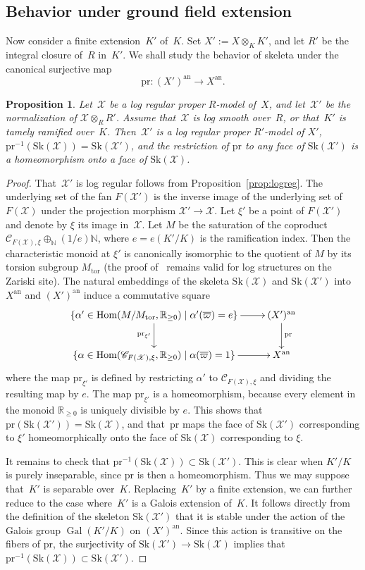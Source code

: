 \documentclass[11pt]{article}
\let\mathcal\mathscr
\newtheorem{prop}[equation]{Proposition}
\theoremstyle{definition}
\numberwithin{equation}{subsection}
\newcommand{\N}{\ensuremath{\mathbb{N}}}
\newcommand{\R}{\ensuremath{\mathbb{R}}}
\newcommand{\cX}{\ensuremath{\mathscr{X}}}
\newcommand{\an}{\mathrm{an}}
\newcommand{\pr}{\mathrm{pr}}
\newcommand{\Sk}{\mathrm{Sk}}
\newcommand{\tor}{\mathrm{tor}}
\DeclareMathOperator{\Gal}{Gal}
\DeclareMathOperator{\Hom}{Hom}
\let\unif\varpi
\begin{document}
\subsection{Behavior under ground field extension}
Now consider a finite extension~$K'$ of~$K$. Set $X':=X\otimes_KK'$, and let
$R'$ be the integral closure of~$R$ in~$K'$. We shall study the behavior of skeleta under
the canonical surjective map
\begin{equation*}
\pr\colon (X')^{\an}\to X^{\an}.
\end{equation*}
\begin{prop}\label{prop:compat2}
Let~$\cX$ be a log regular proper $R$\nobreakdash-model of~$X$, and let~$\cX'$ be the normalization of $\cX\otimes_R R'$. Assume that~$\cX$ is log smooth over~$R$, or that~$K'$ is tamely ramified over~$K$.
Then~$\cX'$ is a log regular proper $R'$-model of $X'$,
$\pr^{-1}(\Sk(\cX))=\Sk(\cX')$,
and the restriction of $\pr$ to any face of $\Sk(\cX')$ is a homeomorphism onto a face of $\Sk(\cX)$.
\end{prop}
\begin{proof} That~$\cX'$ is log regular follows from Proposition~\ref{prop:logreg}.
The underlying set of the fan $F(\cX')$ is the inverse image of the underlying set of $F(\cX)$ under the projection morphism $\cX'\to \cX$.
Let $\xi'$ be a point of $F(\cX')$ and denote by $\xi$ its image in~$\cX$.
Let $M$ be the saturation of the coproduct $\mathcal{C}_{F(\cX),\xi}\oplus_{\N}(1/e)\N$, where $e=e(K'/K)$ is the ramification index.
Then
the characteristic monoid at $\xi'$ is canonically isomorphic to the quotient of $M$ by its torsion subgroup $M_{\tor}$
(the proof of~\cite[2.1.1]{nakayama} remains valid for log structures on the Zariski site).
The natural embeddings of the skeleta $\Sk(\cX)$ and $\Sk(\cX')$ into $X^{\an}$ and $(X')^{\an}$ induce a commutative square
\[ \xymatrix{
\{\alpha'\in \Hom(M/M_{\tor},\R_{\geq 0})\mid \alpha'(\overline{\unif})=e\} \ar[d]_{\pr_{\xi'}} \ar[r] &(X')^{\an} \ar[d]^{\pr}
\\ \{\alpha\in \Hom(\mathcal{C}_{F(\cX),\xi},\R_{\geq 0})\mid \alpha(\overline{\unif})=1 \} \ar[r] & X^{\an} }
\]
where the map $\pr_{\xi'}$ is defined by restricting $\alpha'$ to $\mathcal{C}_{F(\cX),\xi}$ and dividing the resulting map by $e$. The map $\pr_{\xi'}$ is a homeomorphism, because every element in the monoid $\R_{\geq 0}$ is uniquely divisible by $e$.
This shows that $\pr(\Sk(\cX'))=\Sk(\cX)$, and that~$\pr$ maps the face of $\Sk(\cX')$ corresponding to $\xi'$ homeomorphically onto the face of $\Sk(\cX)$ corresponding to $\xi$.

It remains to check that $\pr^{-1}(\Sk(\cX))\subset\Sk(\cX')$. This is clear when $K'/K$ is purely inseparable, since $\pr$ is then a homeomorphism.
Thus we may suppose that~$K'$ is separable over~$K$. Replacing~$K'$ by a finite extension, we can further reduce to the case where~$K'$ is a Galois extension of~$K$. It follows directly from the definition of the skeleton $\Sk(\cX')$ that it is stable under the action of the Galois group $\Gal(K'/K)$ on $(X')^{\an}$. Since this action is transitive on the fibers of $\pr$, the surjectivity of $\Sk(\cX')\to \Sk(\cX)$ implies that
$\pr^{-1}(\Sk(\cX))\subset\Sk(\cX')$.
\end{proof}
\end{document}
